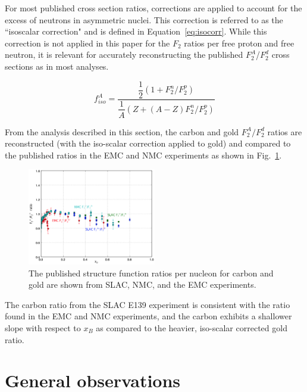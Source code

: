 \documentclass[oneside]{article}
\begin{document}
For most published cross section ratios, corrections are applied to account for the excess of neutrons in asymmetric nuclei. This correction is referred to as the ``isoscalar correction" and is defined in Equation~\eqref{eq:isocorr}. While this correction is not applied in this paper for the $F_2$ ratios per free proton and free neutron, it is relevant for accurately reconstructing the published $F_2^A$/$F_2^d$ cross sections as in most analyses. 

\begin{equation}
f_{iso}^A = \dfrac{\dfrac{1}{2}(1+F_2^n/F_2^p)}{\dfrac{1}{A}(Z+(A-Z)F_2^n/F_2^p)}
\label{eq:isocorr}
\end{equation}

From the analysis described in this section, the carbon and gold $F_2^A/F_2^d$ ratios are reconstructed (with the iso-scalar correction applied to gold) and compared to the published ratios in the EMC and NMC experiments as shown in Fig.~\ref{fig:emc_ratios}.

\begin{figure}[H]
  \centering
      	  \includegraphics[width=0.5\textwidth]{plots/emc_ratios_data.png}
 	 \caption[EMC ratios for various data]{The published structure function ratios per nucleon for carbon and gold are shown from SLAC, NMC, and the EMC experiments.}
  \label{fig:emc_ratios}
 \end{figure}
 
 The carbon ratio from the SLAC E139 experiment is consistent with the ratio found in the EMC and NMC experiments, and the carbon exhibits a shallower slope with respect to $x_B$ as compared to the heavier, iso-scalar corrected gold ratio. 

\section{General observations}
\end{document}
